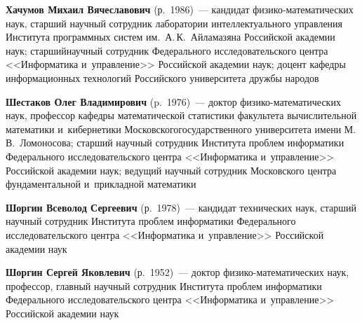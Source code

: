 \begin{multicols}{2}
\noindent
\textbf{Хачумов Михаил Вячеславович} (р.\ 1986)~--- 
кандидат фи\-зи\-ко-ма\-те\-ма\-ти\-че\-ских наук, старший научный сотрудник лаборатории интеллектуального управ\-ления Института 
программных сис\-тем им.\ А.\,К.~Айламазяна Российской академии наук; старший\linebreak научный сотрудник Федерального исследовательского цент\-ра 
<<Информатика и~управ\-ле\-ние>> Российской академии наук; доцент кафедры информационных технологий Российского университета друж\-бы народов


\noindent
\textbf{Шестаков Олег Владимирович} (p.\ 1976)~--- 
доктор фи\-зи\-ко-ма\-те\-ма\-ти\-че\-ских наук, профессор ка\-фед\-ры математической ста\-ти\-сти\-ки 
факультета вы\-чис\-ли\-тель\-ной математики и~кибернетики Московского\linebreak государственного университета имени М.\,В.~Ломоносова; 
старший научный со\-труд\-ник Института проб\-лем информатики Федерального исследовательского цент\-ра <<Информатика и~\mbox{управ\-ле\-ние}>>
 Российской академии наук; ведущий научный со\-труд\-ник Московского цент\-ра фундаментальной и~при\-клад\-ной математики
 
\noindent
\textbf{Шоргин Всеволод Сергеевич} (р.\ 1978)~--- 
кандидат технических наук, старший научный сотрудник Института проб\-лем информатики Федерального исследовательского цент\-ра 
<<Информатика и~управ\-ле\-ние>> Российской академии наук
 
\noindent
\textbf{Шоргин Сергей Яковлевич} (р.\ 1952)~--- доктор фи\-зи\-ко-ма\-те\-ма\-ти\-че\-ских наук, 
профессор, главный научный сотрудник Института проб\-лем информатики Федерального исследовательского цент\-ра 
<<Информатика и~управ\-ле\-ние>> Российской академии наук






\def\leftkol{ОБ АВТОРАХ}

\def\rightkol{ОБ АВТОРАХ}


 \label{end\stat}



\end{multicols}

\def\leftkol{ОБ АВТОРАХ}
\def\rightkol{ОБ АВТОРАХ}

\newpage